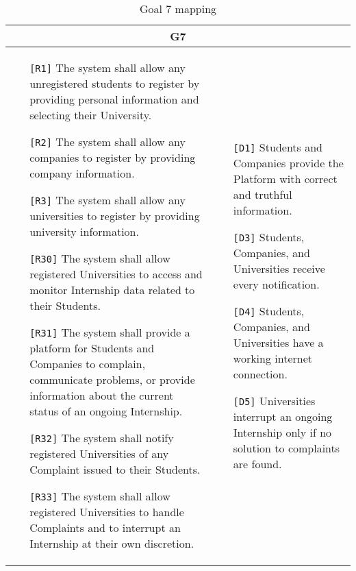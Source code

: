 \begin{table}[H]
    \centering
    \begin{tabular}{|p{8cm}|p{8cm}|}
         \hline
        \multicolumn{2}{|c|}{G7} \\
        \hline
        \begin{itemize}
            \item[\texttt{[R1]}] The system shall allow any unregistered students to register by providing personal information and selecting their University. 
            \item[\texttt{[R2]}] The system shall allow any companies to register by providing company information. 
            \item[\texttt{[R3]}] The system shall allow any universities to register by providing university information. 
            \item[\texttt{[R30]}] The system shall allow registered Universities to access and monitor Internship data related to their Students.
            \item[\texttt{[R31]}] The system shall provide a platform for Students and Companies to complain, communicate problems, or provide information about the current status of an ongoing Internship.
            \item[\texttt{[R32]}] The system shall notify registered Universities of any Complaint issued to their Students.
            \item[\texttt{[R33]}] The system shall allow registered Universities to handle Complaints and to interrupt an Internship at their own discretion.
        \end{itemize} & 
        \begin{itemize}
            \item[\texttt{[D1]}] Students and Companies provide the Platform with correct and truthful information.
            \item[\texttt{[D3]}] Students, Companies, and Universities receive every notification.
            \item[\texttt{[D4]}] Students, Companies, and Universities have a working internet connection.
            \item[\texttt{[D5]}] Universities interrupt an ongoing Internship only if no solution to complaints are found.
        \end{itemize} \\ \hline
    \end{tabular}
    \caption{Goal 7 mapping}
    \label{tab:G7}
\end{table}


